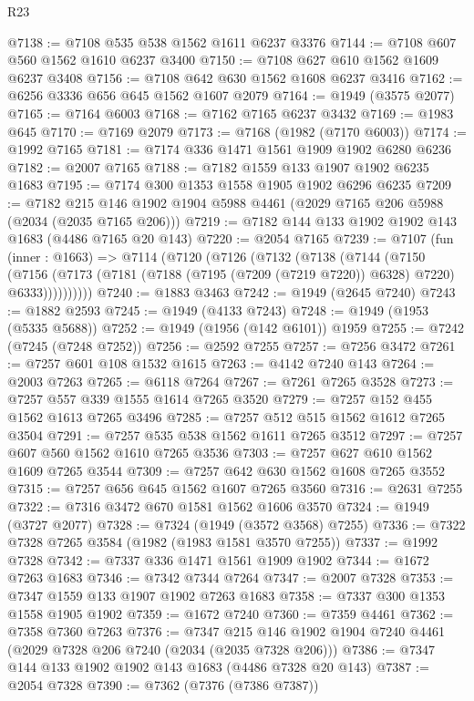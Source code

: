 \begin{lexlean}{R23}
\begin{coremodule}
@7138 := @7108 @535 @538 @1562 @1611 @6237 @3376
@7144 := @7108 @607 @560 @1562 @1610 @6237 @3400
@7150 := @7108 @627 @610 @1562 @1609 @6237 @3408
@7156 := @7108 @642 @630 @1562 @1608 @6237 @3416
@7162 := @6256 @3336 @656 @645 @1562 @1607 @2079
@7164 := @1949 (@3575 @2077)
@7165 := @7164 @6003
@7168 := @7162 @7165 @6237 @3432
@7169 := @1983 @645
@7170 := @7169 @2079
@7173 := @7168 (@1982 (@7170 @6003))
@7174 := @1992 @7165
@7181 := @7174 @336 @1471 @1561 @1909 @1902 @6280 @6236
@7182 := @2007 @7165
@7188 := @7182 @1559 @133 @1907 @1902 @6235 @1683
@7195 := @7174 @300 @1353 @1558 @1905 @1902 @6296 @6235
@7209 := @7182 @215 @146 @1902 @1904 @5988 @4461 (@2029 @7165 @206 @5988 (@2034 (@2035 @7165 @206)))
@7219 := @7182 @144 @133 @1902 @1902 @143 @1683 (@4486 @7165 @20 @143)
@7220 := @2054 @7165
@7239 := @7107
    (fun (inner : @1663) =>
    @7114
      (@7120
        (@7126
          (@7132
            (@7138
              (@7144
                (@7150
                  (@7156
                    (@7173 (@7181 (@7188 (@7195 (@7209 (@7219 @7220)) @6328) @7220) @6333))))))))))
@7240 := @1883 @3463
@7242 := @1949 (@2645 @7240)
@7243 := @1882 @2593
@7245 := @1949 (@4133 @7243)
@7248 := @1949 (@1953 (@5335 @5688))
@7252 := @1949 (@1956 (@142 @6101)) @1959
@7255 := @7242 (@7245 (@7248 @7252))
@7256 := @2592 @7255
@7257 := @7256 @3472
@7261 := @7257 @601 @108 @1532 @1615
@7263 := @4142 @7240 @143
@7264 := @2003 @7263
@7265 := @6118 @7264
@7267 := @7261 @7265 @3528
@7273 := @7257 @557 @339 @1555 @1614 @7265 @3520
@7279 := @7257 @152 @455 @1562 @1613 @7265 @3496
@7285 := @7257 @512 @515 @1562 @1612 @7265 @3504
@7291 := @7257 @535 @538 @1562 @1611 @7265 @3512
@7297 := @7257 @607 @560 @1562 @1610 @7265 @3536
@7303 := @7257 @627 @610 @1562 @1609 @7265 @3544
@7309 := @7257 @642 @630 @1562 @1608 @7265 @3552
@7315 := @7257 @656 @645 @1562 @1607 @7265 @3560
@7316 := @2631 @7255
@7322 := @7316 @3472 @670 @1581 @1562 @1606 @3570
@7324 := @1949 (@3727 @2077)
@7328 := @7324 (@1949 (@3572 @3568) @7255)
@7336 := @7322 @7328 @7265 @3584 (@1982 (@1983 @1581 @3570 @7255))
@7337 := @1992 @7328
@7342 := @7337 @336 @1471 @1561 @1909 @1902
@7344 := @1672 @7263 @1683
@7346 := @7342 @7344 @7264
@7347 := @2007 @7328
@7353 := @7347 @1559 @133 @1907 @1902 @7263 @1683
@7358 := @7337 @300 @1353 @1558 @1905 @1902
@7359 := @1672 @7240
@7360 := @7359 @4461
@7362 := @7358 @7360 @7263
@7376 := @7347 @215 @146 @1902 @1904 @7240 @4461 (@2029 @7328 @206 @7240 (@2034 (@2035 @7328 @206)))
@7386 := @7347 @144 @133 @1902 @1902 @143 @1683 (@4486 @7328 @20 @143)
@7387 := @2054 @7328
@7390 := @7362 (@7376 (@7386 @7387))

\end{coremodule}
\end{lexlean}
